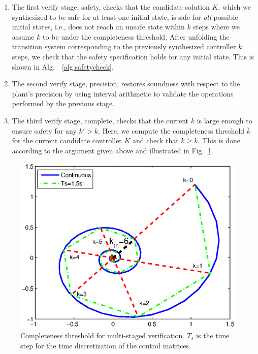 \documentclass[twocolumn]{autart}    %
\begin{document}
\begin{enumerate}
\item The first {\sc verify} stage, {\sc safety}, checks that the candidate
solution $K$, which we synthesized to be safe for at least one initial
state, is safe for \emph{all} possible initial states, i.e., does not reach
an unsafe state within $k$ steps where we assume $k$ to be under the
completeness threshold.  After unfolding the transition system corresponding
to the previously synthesized controller $k$ steps, we check that the safety
specification holds for any initial state. This is shown in Alg.~~\ref{alg:safetycheck}.

\item The second {\sc verify} stage, {\sc precision}, 
 restores soundness with respect to the plant's precision
by using interval arithmetic \cite{moore1966interval} to validate the 
operations performed by the previous stage. 

\item The third {\sc verify} stage, {\sc complete}, checks that the current
$k$ is large enough to ensure safety for any $k'{>}k$.  Here, we compute the
completeness threshold $\overline{k}$ for the current candidate controller $K$ and
check that $k{\geq}\overline{k}$.  This is done according to the argument
given above and illustrated in Fig.~\ref{fig:ct}.

\end{enumerate}

\begin{figure}[t]
\centering
\includegraphics[width=\columnwidth]{figures/ct.eps}
\caption{Completeness threshold for multi-staged verification. $T_s$ is the time step for the time discretization of the control matrices.}
\label{fig:ct}
\end{figure}
\end{document}
